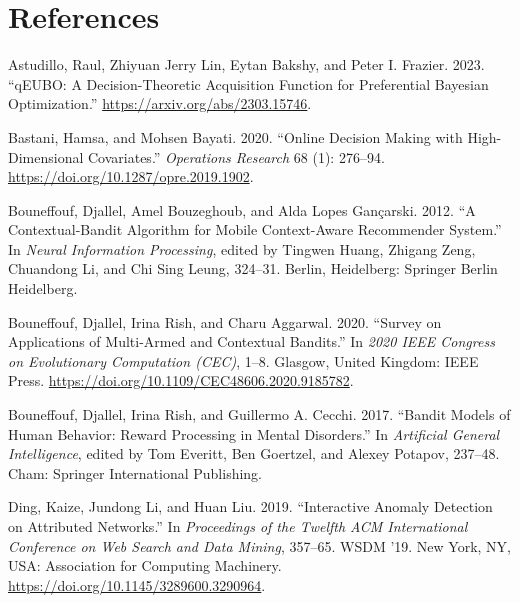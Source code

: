 \documentclass[
  letterpaper,
  numbers=noenddot,
  DIV=11]{scrreprt}
\newlength{\cslhangindent}
\newenvironment{CSLReferences}[2] %
 {\begin{list}{}{%
  \setlength{\itemindent}{0pt}
  \setlength{\leftmargin}{0pt}
  \setlength{\parsep}{0pt}
  \ifodd #1
   \setlength{\leftmargin}{\cslhangindent}
   \setlength{\itemindent}{-1\cslhangindent}
  \fi
  \setlength{\itemsep}{#2\baselineskip}}}
 {\end{list}}
\theoremstyle{definition}
\theoremstyle{plain}
\theoremstyle{plain}
\theoremstyle{remark}
\begin{document}
\section*{References}\label{bibliography-4}


\label{refs-4}
\begin{CSLReferences}{1}{0}
Astudillo, Raul, Zhiyuan Jerry Lin, Eytan Bakshy, and Peter I. Frazier.
2023. {``qEUBO: A Decision-Theoretic Acquisition Function for
Preferential Bayesian Optimization.''}
\url{https://arxiv.org/abs/2303.15746}.

Bastani, Hamsa, and Mohsen Bayati. 2020. {``Online Decision Making with
High-Dimensional Covariates.''} \emph{Operations Research} 68 (1):
276--94. \url{https://doi.org/10.1287/opre.2019.1902}.

Bouneffouf, Djallel, Amel Bouzeghoub, and Alda Lopes Gançarski. 2012.
{``A Contextual-Bandit Algorithm for Mobile Context-Aware Recommender
System.''} In \emph{Neural Information Processing}, edited by Tingwen
Huang, Zhigang Zeng, Chuandong Li, and Chi Sing Leung, 324--31. Berlin,
Heidelberg: Springer Berlin Heidelberg.

Bouneffouf, Djallel, Irina Rish, and Charu Aggarwal. 2020. {``Survey on
Applications of Multi-Armed and Contextual Bandits.''} In \emph{2020
IEEE Congress on Evolutionary Computation (CEC)}, 1--8. Glasgow, United
Kingdom: IEEE Press.
\url{https://doi.org/10.1109/CEC48606.2020.9185782}.

Bouneffouf, Djallel, Irina Rish, and Guillermo A. Cecchi. 2017.
{``Bandit Models of Human Behavior: Reward Processing in Mental
Disorders.''} In \emph{Artificial General Intelligence}, edited by Tom
Everitt, Ben Goertzel, and Alexey Potapov, 237--48. Cham: Springer
International Publishing.

Ding, Kaize, Jundong Li, and Huan Liu. 2019. {``Interactive Anomaly
Detection on Attributed Networks.''} In \emph{Proceedings of the Twelfth
ACM International Conference on Web Search and Data Mining}, 357--65.
WSDM '19. New York, NY, USA: Association for Computing Machinery.
\url{https://doi.org/10.1145/3289600.3290964}.


\end{CSLReferences}
\end{document}
